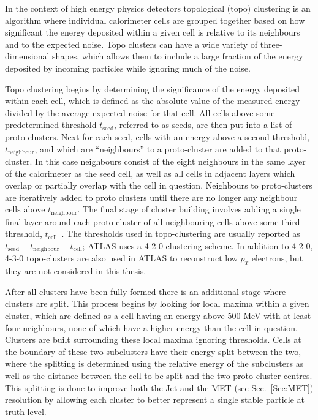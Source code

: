 In the context of high energy physics detectors topological (topo) clustering is an algorithm where individual calorimeter cells are grouped together based on how significant the energy deposited within a given cell is relative to its neighbours and to the expected noise.  
Topo clusters can have a wide variety of three-dimensional shapes, which allows them to include a large fraction of the energy deposited by incoming particles while ignoring much of the noise.  

Topo clustering begins by determining the significance of the energy deposited within each cell, which is defined as the absolute value of the measured energy divided by the average expected noise for that cell.  
All cells above some predetermined threshold $t_{\mathrm{seed}}$, referred to as seeds, are then put into a list of proto-clusters.  
Next for each seed, cells with an energy above a second threshold, $t_{\mathrm{neighbour}}$, and which are ``neighbours'' to a proto-cluster are added to that proto-cluster.  
In this case neighbours consist of the eight neighbours in the same layer of the calorimeter as the seed cell, as well as all cells in adjacent layers which overlap or partially overlap with the cell in question.  
Neighbours to proto-clusters are iteratively added to proto clusters until there are no longer any neighbour cells above $t_{\mathrm{neighbour}}$.  
The final stage of cluster building involves adding a single final layer around each proto-cluster of all neighbouring cells above some third threshold, $t_{\mathrm{cell}}$~\cite{1603.02934}.  
The thresholds used in topo-clustering are usually reported as $t_{\mathrm{seed}}-t_{\mathrm{neighbour}}-t_{\mathrm{cell}}$; ATLAS uses a 4-2-0 clustering scheme.  
In addition to 4-2-0, 4-3-0 topo-clusters are also used in ATLAS to reconstruct low $p_T$ electrons, but they are not considered in this thesis.   

After all clusters have been fully formed there is an additional stage where clusters are split.  
This process begins by looking for local maxima within a given cluster, which are defined as a cell having an energy above 500 MeV with at least four neighbours, none of which have a higher energy than the cell in question.  
Clusters are built surrounding these local maxima ignoring thresholds.  
Cells at the boundary of these two subclusters have their energy split between the two, where the splitting is determined using the relative energy of the subclusters as well as the distance between the cell to be split and the two proto-cluster centres.  
This splitting is done to improve both the Jet and the \gls{MET} (see Sec.~\ref{Sec:MET}) resolution by allowing each cluster to better represent a single stable particle at truth level.  

